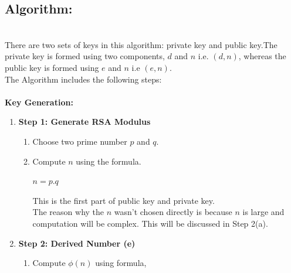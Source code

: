 \documentclass[a4paper]{report} %
\begin{document}
\subsection{Algorithm:}\\
There are two sets of keys in this algorithm: private key and public key.The private key is formed using two components, $d$ and $n$ i.e. $(d,n)$, whereas the public key is formed using $e$ and $n$ i.e $(e,n)$.\\
The Algorithm includes the following steps:\\\\
\textbf{Key Generation:}\\
\begin{enumerate}
    \item \textbf{Step 1: Generate RSA Modulus }\\
    \begin{enumerate}
        \item Choose two prime number $p$ and $q$.
        \item Compute $n$ using the formula.\\
        \begin{center}
            $n=p.q$
        \end{center}
        This is the first part of public key and private key. \\
        The reason why the $n$ wasn't chosen directly is because $n$ is large and computation will be complex. This will be discussed in Step 2(a).
    \end{enumerate}
    \item \textbf{Step 2: Derived Number (e)}\\
    \begin{enumerate}
        \item Compute $\phi(n)$ using formula, \\
        \begin{center}
        

\end{center}
\end{enumerate}
\end{enumerate}
\end{document}

